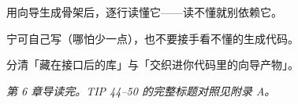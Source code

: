 \begin{actions}
\item 用向导生成骨架后，逐行读懂它——读不懂就别依赖它。
\item 宁可自己写（哪怕少一点），也不要接手看不懂的生成代码。
\item 分清「藏在接口后的库」与「交织进你代码里的向导产物」。
\end{actions}

\vspace{0.6em}
\begin{center}
\small\itshape\color{ppgray}
第 6 章导读完。TIP 44--50 的完整标题对照见附录 A。
\end{center}
